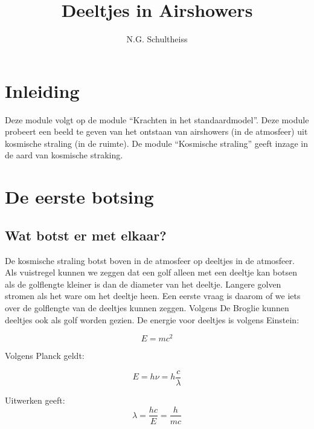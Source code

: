 



\title{Deeltjes in Airshowers}
\author{N.G. Schultheiss}
\date{}

\maketitle
\thispagestyle{firststyle}

\section{Inleiding}

Deze module volgt op de module ``Krachten in het standaardmodel''.
Deze module probeert een beeld te geven van het ontstaan van airshowers
(in de atmosfeer) uit kosmische straling (in de ruimte). De module
``Kosmische straling'' geeft inzage in de aard van kosmische straking.


\section{De eerste botsing}


\subsection{Wat botst er met elkaar?}

De kosmische straling botst boven in de atmosfeer op deeltjes in de
atmosfeer. Als vuistregel kunnen we zeggen dat een golf alleen met
een deeltje kan botsen als de golflengte kleiner is dan de diameter
van het deeltje. Langere golven stromen als het ware om het deeltje
heen. Een eerste vraag is daarom of we iets over de golflengte van
de deeltjes kunnen zeggen. Volgens De Broglie kunnen deeltjes ook
als golf worden gezien. De energie voor deeltjes is volgens Einstein:

\begin{equation}
E=mc^{2}
\end{equation}


Volgens Planck geldt:

\begin{equation}
E=h\nu=h\frac{c}{\lambda}
\end{equation}


Uitwerken geeft:
\begin{equation}
\lambda=\frac{hc}{E}=\frac{h}{mc}
\end{equation}



